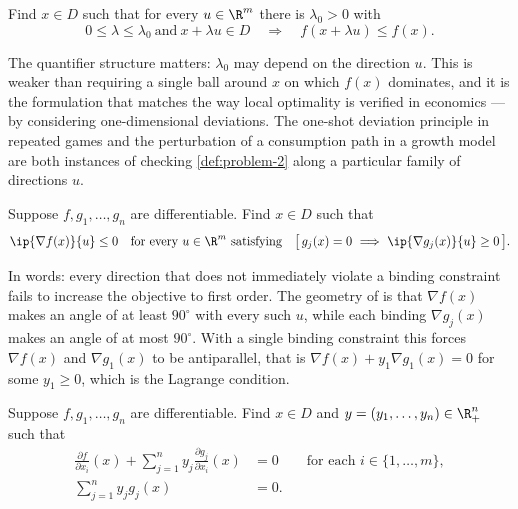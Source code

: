 \begin{definition}\label{def:problem-2}
	Find $x\in D$ such that for every $u\in\R^m$ there is $\lambda_0>0$ with
	\[
		0\leq\lambda\leq\lambda_0\ \text{and}\ x+\lambda u\in D
		\quad\Longrightarrow\quad f(x+\lambda u)\leq f(x).
	\]
\end{definition}

The quantifier structure matters: $\lambda_0$ may depend on the direction $u$.
This is weaker than requiring a single ball around $x$ on which $f(x)$ dominates,
and it is the formulation that matches the way local optimality is verified in
economics --- by considering one-dimensional deviations. The one-shot deviation
principle in repeated games and the perturbation of a consumption path in a
growth model are both instances of checking \autoref{def:problem-2} along a
particular family of directions $u$.

\begin{definition}\label{def:problem-3}
	Suppose $f,g_1,\dots,g_n$ are differentiable. Find $x\in D$ such that
	\[
		\ip{\nabla f(x)}{u}\leq0
		\quad\text{for every }u\in\R^m\text{ satisfying}\quad
		\bigl[\,g_j(x)=0\ \Longrightarrow\ \ip{\nabla g_j(x)}{u}\geq0\,\bigr].
	\]
\end{definition}

In words: every direction that does not immediately violate a binding constraint
fails to increase the objective to first order. The geometry of
\autocite[slides 12--13]{fukuda2026optimization} is that $\nabla f(x)$ makes an
angle of at least $90^{\circ}$ with every such $u$, while each binding
$\nabla g_j(x)$ makes an angle of at most $90^{\circ}$. With a single binding
constraint this forces $\nabla f(x)$ and $\nabla g_1(x)$ to be antiparallel, that
is $\nabla f(x)+y_1\nabla g_1(x)=0$ for some $y_1\geq0$, which is the Lagrange
condition.

\begin{definition}\label{def:problem-4}
	Suppose $f,g_1,\dots,g_n$ are differentiable. Find $x\in D$ and
	$y=(y_1,\dots,y_n)\in\R^n_+$ such that
	\begin{align}
		\frac{\partial f}{\partial x_i}(x)
		+\sum_{j=1}^{n}y_j\frac{\partial g_j}{\partial x_i}(x) & =0
		\qquad\text{for each }i\in\{1,\dots,m\},\label{eq:kkt-foc}                     \\
		\sum_{j=1}^{n}y_jg_j(x)                                & =0 .\label{eq:kkt-cs}
	\end{align}
\end{definition}

